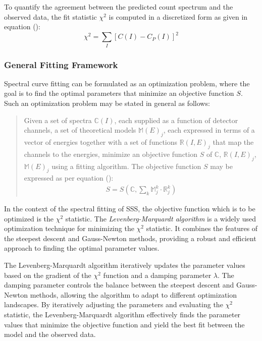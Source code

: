 				To quantify the agreement between the predicted count spectrum and the observed data, the fit statistic $\chi^2$ is computed in a discretized form as given in equation ():
				\begin{equation}
					\chi^2=\sum_I{[C(I)-C_P(I)]^2} \label{eqn:spec-chisq-software}
				\end{equation}

    		
    		\subsubsection{General Fitting Framework}
    			Spectral curve fitting can be formulated as an optimization problem, where the goal is to find the optimal parameters that minimize an objective function $S$. Such an optimization problem may be stated in general as follows:
    			
    			\begin{quotation}
    				Given a set of spectra $\mathbb{C}(I)$, each supplied as a function of detector channels, a set of theoretical models {$\mathbb{M}(E)_j$}, each expressed in terms of a vector of energies together with a set of functions {$\mathbb{R}(I,E)_j$} that map the channels to the energies, minimize an objective function $S$ of $\mathbb{C}$, {$\mathbb{R}(I,E)_j$}, {$\mathbb{M}(E)_j$} using a fitting algorithm. The objective function $S$ may be expressed as per equation ():
    				\begin{align}
						S=S(\mathbb{C},\sum_k{\mathbb{M}_j^k\cdot\mathbb{R}_j^k}) \label{eqn:spec-gen-framework}
					\end{align}
    			\end{quotation}
    			
    			In the context of the spectral fitting of SSS, the objective function which is to be optimized is the $\chi^2$ statistic. The \textit{Levenberg-Marquardt algorithm} is a widely used optimization technique for minimizing the $\chi^2$ statistic. It combines the features of the steepest descent and Gauss-Newton methods, providing a robust and efficient approach to finding the optimal parameter values.
    			
    			The Levenberg-Marquardt algorithm iteratively updates the parameter values based on the gradient of the $\chi^2$ function and a damping parameter $\lambda$. The damping parameter controls the balance between the steepest descent and Gauss-Newton methods, allowing the algorithm to adapt to different optimization landscapes. By iteratively adjusting the parameters and evaluating the $\chi^2$ statistic, the Levenberg-Marquardt algorithm effectively finds the parameter values that minimize the objective function and yield the best fit between the model and the observed data.

